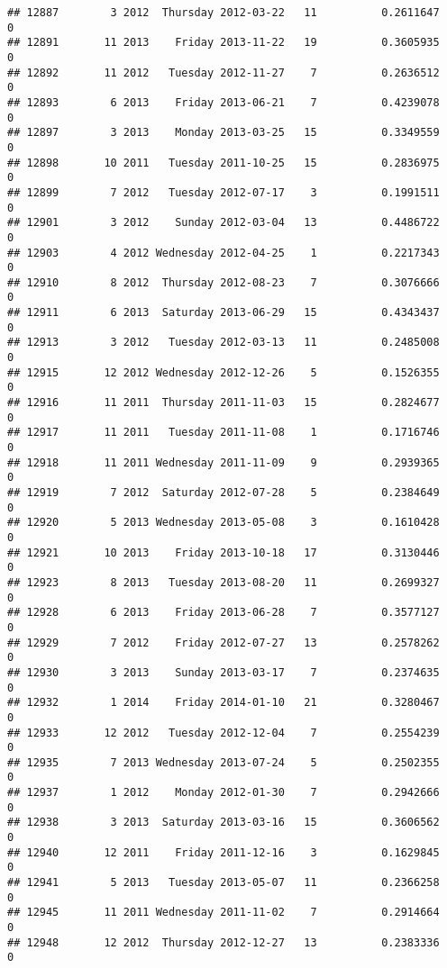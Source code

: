 \documentclass[
]{article}
\begin{document}
\begin{verbatim}
## 12887        3 2012  Thursday 2012-03-22   11          0.2611647             0
## 12891       11 2013    Friday 2013-11-22   19          0.3605935             0
## 12892       11 2012   Tuesday 2012-11-27    7          0.2636512             0
## 12893        6 2013    Friday 2013-06-21    7          0.4239078             0
## 12897        3 2013    Monday 2013-03-25   15          0.3349559             0
## 12898       10 2011   Tuesday 2011-10-25   15          0.2836975             0
## 12899        7 2012   Tuesday 2012-07-17    3          0.1991511             0
## 12901        3 2012    Sunday 2012-03-04   13          0.4486722             0
## 12903        4 2012 Wednesday 2012-04-25    1          0.2217343             0
## 12910        8 2012  Thursday 2012-08-23    7          0.3076666             0
## 12911        6 2013  Saturday 2013-06-29   15          0.4343437             0
## 12913        3 2012   Tuesday 2012-03-13   11          0.2485008             0
## 12915       12 2012 Wednesday 2012-12-26    5          0.1526355             0
## 12916       11 2011  Thursday 2011-11-03   15          0.2824677             0
## 12917       11 2011   Tuesday 2011-11-08    1          0.1716746             0
## 12918       11 2011 Wednesday 2011-11-09    9          0.2939365             0
## 12919        7 2012  Saturday 2012-07-28    5          0.2384649             0
## 12920        5 2013 Wednesday 2013-05-08    3          0.1610428             0
## 12921       10 2013    Friday 2013-10-18   17          0.3130446             0
## 12923        8 2013   Tuesday 2013-08-20   11          0.2699327             0
## 12928        6 2013    Friday 2013-06-28    7          0.3577127             0
## 12929        7 2012    Friday 2012-07-27   13          0.2578262             0
## 12930        3 2013    Sunday 2013-03-17    7          0.2374635             0
## 12932        1 2014    Friday 2014-01-10   21          0.3280467             0
## 12933       12 2012   Tuesday 2012-12-04    7          0.2554239             0
## 12935        7 2013 Wednesday 2013-07-24    5          0.2502355             0
## 12937        1 2012    Monday 2012-01-30    7          0.2942666             0
## 12938        3 2013  Saturday 2013-03-16   15          0.3606562             0
## 12940       12 2011    Friday 2011-12-16    3          0.1629845             0
## 12941        5 2013   Tuesday 2013-05-07   11          0.2366258             0
## 12945       11 2011 Wednesday 2011-11-02    7          0.2914664             0
## 12948       12 2012  Thursday 2012-12-27   13          0.2383336             0

\end{verbatim}
\end{document}
